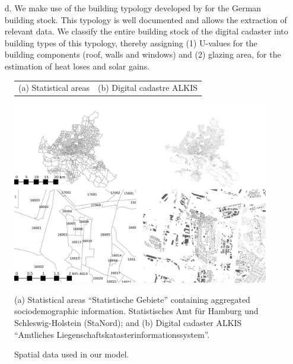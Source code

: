 \documentclass[11pt]{IJM-article}
\begin{document}
\begin{enumerate}
        contains a lot of information on the building stock of the city.  Each
        building is geo-referenced and contains a set of attributes.  From
        these attributes we use both the geo-reference (to estimate living
        space and building orientation) and the attributes to estimate energy
        relevant properties of the individual buildings, through the use of a
        building typology (see d below). See Figure~\ref{fig:2b}b for the
        buildings recorded in the digital cadaster of Hamburg.
    \item[d.] We make use of the building typology developed by
         for the German building stock. This typology is well
        documented and allows the extraction of relevant data. We classify the
        entire building stock of the digital cadaster into building types of
        this typology, thereby assigning (1) U-values for the building
        components (roof, walls and windows) and (2) glazing area, for the
        estimation of heat loses and solar gains.
\end{enumerate}\pb

\begin{figure}[htb]
    \caption{Spatial data used in our model.}
    \label{fig:2}
    \centering
    \vspace{2ex}
    \begin{tabular}{p{}p{}}
        (a) Statistical areas \label{fig:2a} & 
        (b) Digital cadastre ALKIS \label{fig:2b}\\
    \end{tabular}
    \includegraphics[width=\textwidth]{FIGURES/Data.jpg}
    \begin{flushleft}
    \begin{footnotesize}
(a) Statistical areas ``Statistische Gebiete'' containing aggregated
sociodemographic information. Statistisches Amt für Hamburg und
Schleswig-Holstein (StaNord); and (b) Digital cadaster ALKIS ``Amtliches
Liegenschaftskatasterinformationssystem''. 
    \end{footnotesize}
    \end{flushleft}
\end{figure}
\end{document}
